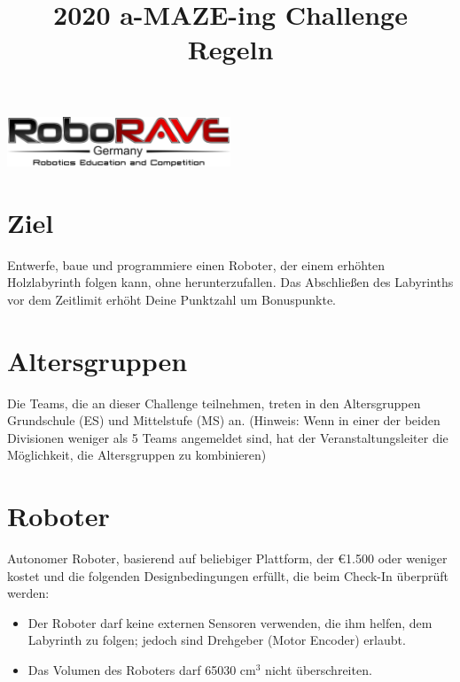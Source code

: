 \documentclass[a4paper,12pt]{article}
\title{2020 a-MAZE-ing Challenge Regeln}
\makeatletter
\let\inserttitle\@title
\makeatother
\begin{document}
\begin{center}
	\includegraphics[width=0.5\textwidth]{logo.png}

	\huge                      %
	\bfseries                   %
	\inserttitle
\end{center}
\section{Ziel}
Entwerfe, baue und programmiere einen Roboter, der einem erhöhten Holzlabyrinth
folgen kann, ohne herunterzufallen. Das Abschließen des Labyrinths vor dem
Zeitlimit erhöht Deine Punktzahl um Bonuspunkte.

\section{Altersgruppen}
Die Teams, die an dieser Challenge teilnehmen, treten in den Altersgruppen
Grundschule (ES) und Mittelstufe (MS) an. (Hinweis: Wenn in einer der beiden
	Divisionen weniger als 5 Teams angemeldet sind, hat der Veranstaltungsleiter
die Möglichkeit, die Altersgruppen zu kombinieren)

\section{Roboter}
Autonomer Roboter, basierend auf beliebiger Plattform, der \euro{1.500}  oder weniger kostet und die folgenden Designbedingungen erfüllt, die beim Check-In überprüft werden:
\begin{itemize}
	\item Der Roboter darf keine externen Sensoren verwenden, die ihm helfen, dem Labyrinth zu folgen; jedoch sind Drehgeber (Motor Encoder) erlaubt.
	\item Das Volumen des Roboters darf 65030 cm$^{3}$ nicht überschreiten.
\end{itemize}
\end{document}
